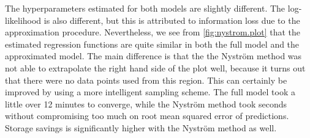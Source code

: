 \documentclass[showframe,11pt,twoside,openright]{report}\usepackage[]{graphicx}\usepackage[]{color}
\begin{document}
The hyperparameters estimated for both models are slightly different.
The log-likelihood is also different, but this is attributed to information loss due to the approximation procedure.
Nevertheless, we see from \cref{fig:nystrom.plot} that the estimated regression functions are quite similar in both the full model and the approximated model.
The main difference is that the the Nystr\"om method was not able to extrapolate the right hand side of the plot well, because it turns out that there were no data points used from this region.
This can certainly be improved by using a more intelligent sampling scheme.
The full model took a little over 12 minutes to converge, while the Nystr\"om method took seconds without compromising too much on root mean squared error of predictions.
Storage savings is significantly higher with the Nystr\"om method as well.
\end{document}
